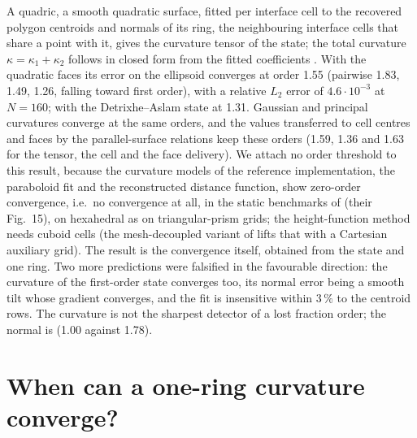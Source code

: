 \documentclass[preprint,12pt]{elsarticle}
\begin{document}
A quadric, a smooth quadratic surface, fitted per interface cell to the recovered polygon centroids and normals of its ring, the neighbouring interface cells that share a point with it, gives the curvature tensor of the state; the total curvature $\kappa = \kappa_1 + \kappa_2$ follows in closed form from the fitted coefficients \citep{GoldmanCurvature2005}. With the quadratic faces its error on the ellipsoid converges at order 1.55 (pairwise 1.83, 1.49, 1.26, falling toward first order), with a relative $L_2$ error of $4.6\cdot10^{-3}$ at $N = 160$; with the Detrixhe--Aslam state at 1.31. Gaussian and principal curvatures converge at the same orders, and the values transferred to cell centres and faces by the parallel-surface relations keep these orders (1.59, 1.36 and 1.63 for the tensor, the cell and the face delivery). We attach no order threshold to this result, because the curvature models of the reference implementation, the paraboloid fit and the reconstructed distance function, show zero-order convergence, i.e.\ no convergence at all, in the static benchmarks of \citet{ScheuflerRoenby2023TwoPhaseFlow} (their Fig.~15), on hexahedral as on triangular-prism grids; the height-function method needs cuboid cells (the mesh-decoupled variant of \citet{OwkesDesjardins2015} lifts that with a Cartesian auxiliary grid). The result is the convergence itself, obtained from the state and one ring. Two more predictions were falsified in the favourable direction: the curvature of the first-order state converges too, its normal error being a smooth tilt whose gradient converges, and the fit is insensitive within $3\,\%$ to the centroid rows. The curvature is not the sharpest detector of a lost fraction order; the normal is (1.00 against 1.78).

\section{When can a one-ring curvature converge?}
\label{sec:onering}
\end{document}
